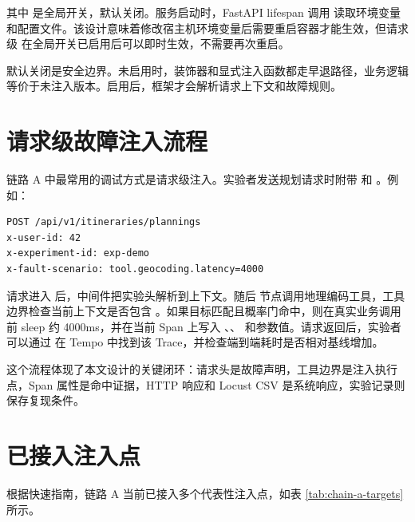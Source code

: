 其中  是全局开关，默认关闭。服务启动时，FastAPI lifespan 调用  读取环境变量和配置文件。该设计意味着修改宿主机环境变量后需要重启容器才能生效，但请求级  在全局开关已启用后可以即时生效，不需要再次重启。

默认关闭是安全边界。未启用时，装饰器和显式注入函数都走早退路径，业务逻辑等价于未注入版本。启用后，框架才会解析请求上下文和故障规则。

\section{请求级故障注入流程}

链路 A 中最常用的调试方式是请求级注入。实验者发送规划请求时附带  和 。例如：

\begin{verbatim}
POST /api/v1/itineraries/plannings
x-user-id: 42
x-experiment-id: exp-demo
x-fault-scenario: tool.geocoding.latency=4000
\end{verbatim}

请求进入  后，中间件把实验头解析到上下文。随后  节点调用地理编码工具，工具边界检查当前上下文是否包含 。如果目标匹配且概率门命中，则在真实业务调用前 sleep 约 4000ms，并在当前 Span 上写入 、、 和参数值。请求返回后，实验者可以通过  在 Tempo 中找到该 Trace，并检查端到端耗时是否相对基线增加。

这个流程体现了本文设计的关键闭环：请求头是故障声明，工具边界是注入执行点，Span 属性是命中证据，HTTP 响应和 Locust CSV 是系统响应，实验记录则保存复现条件。

\section{已接入注入点}

根据快速指南，链路 A 当前已接入多个代表性注入点，如表 \ref{tab:chain-a-targets} 所示。

